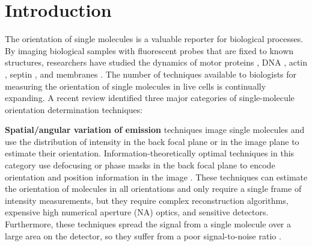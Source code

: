 \documentclass[10pt]{article}
\begin{document}





\section{Introduction}
The orientation of single molecules is a valuable reporter for
biological processes. By imaging biological samples with fluorescent probes that
are fixed to known structures, researchers have studied the dynamics of motor
proteins \cite{peterman2001, forkey2003}, DNA \cite{backer2016}, actin
\cite{mehta2016}, septin \cite{demay2011, mcquilken2017}, and membranes
\cite{anantharam2010}. The number of techniques available to biologists for
measuring the orientation of single molecules in live cells is continually
expanding. A recent review \cite{backlund2014} identified three major categories
of single-molecule orientation determination techniques:

\textbf{Spatial/angular variation of emission} techniques image single molecules
and use the distribution of intensity in the back focal plane \cite{lieb2004} or
in the image plane \cite{backer2014} to estimate their
orientation. Information-theoretically optimal techniques in this category use
defocusing or phase masks in the back focal plane to encode orientation and
position information in the image \cite{agrawal2012}. These techniques can
estimate the orientation of molecules in all orientations and only require a
single frame of intensity measurements, but they require complex reconstruction
algorithms, expensive high numerical aperture (NA) optics, and sensitive
detectors. Furthermore, these techniques spread the signal from a single
molecule over a large area on the detector, so they suffer from a poor
signal-to-noise ratio \cite{toprak2006}.
\end{document}
